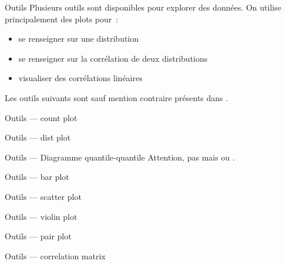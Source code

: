 \begin{frame}{Outils}
  Plusieurs outils sont disponibles pour explorer des données. On
  utilise principalement des plots pour :
  \begin{itemize}
  \item se renseigner sur une distribution
  \item se renseigner sur la corrélation de deux distributions
  \item visualiser des corrélations linéaires
  \end{itemize}
  Les outils suivants sont sauf mention contraire présents dans
  .
\end{frame}

\begin{frame}{Outils — count plot}
\end{frame}

\begin{frame}{Outils — dist plot}
\end{frame}

\begin{frame}{Outils — Diagramme quantile-quantile}
  Attention, pas 
  mais
  ou
  .
\end{frame}

\begin{frame}{Outils — bar plot}
\end{frame}

\begin{frame}{Outils — scatter plot}
\end{frame}

\begin{frame}{Outils — violin plot}
\end{frame}

\begin{frame}{Outils — pair plot}
\end{frame}

\begin{frame}{Outils — correlation matrix}
\end{frame}

